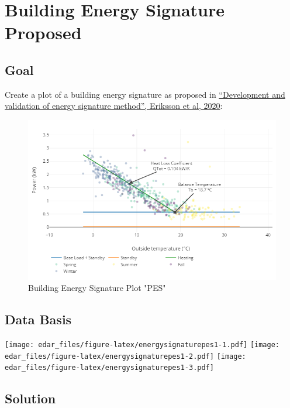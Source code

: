 \documentclass[
  a4paperpaper,
]{book}
\begin{document}
\newpage

\hypertarget{building-energy-signature-proposed}{%
\section{Building Energy Signature Proposed}\label{building-energy-signature-proposed}}

\hypertarget{goal-24}{%
\subsection{Goal}\label{goal-24}}

Create a plot of a building energy signature as proposed in \href{https://doi.org/10.1016/j.enbuild.2020.109756}{``Development and validation of energy signature method'', Eriksson et al, 2020}:

\begin{figure}
\includegraphics[width=0.7\linewidth]{images/plotBldgEngySigProposed} \caption{Building Energy Signature Plot "PES"}\label{fig:unnamed-chunk-34}
\end{figure}

\hypertarget{data-basis-24}{%
\subsection{Data Basis}\label{data-basis-24}}

\texttt{[image: edar\_files/figure-latex/energysignaturepes1-1.pdf]} \texttt{[image: edar\_files/figure-latex/energysignaturepes1-2.pdf]} \texttt{[image: edar\_files/figure-latex/energysignaturepes1-3.pdf]}

\newpage

\hypertarget{solution-24}{%
\subsection{Solution}\label{solution-24}}
\end{document}
